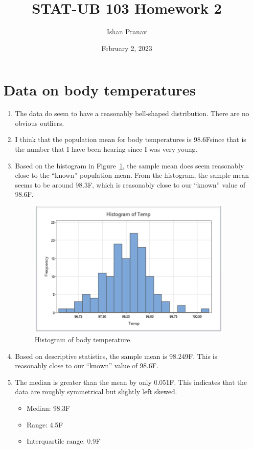 \documentclass[12pt]{article}
\title{STAT-UB 103 Homework 2}
\author{Ishan Pranav}
\date{February 2, 2023}
\newcommand{\degreef}{\degree F}
\begin{document}
\maketitle
\section{Data on body temperatures}
\begin{enumerate}
\item The data do seem to have a reasonably bell-shaped distribution. There are no obvious outliers. 

\item I think that the population mean for body temperatures is 98.6\degreef since that is the number that I have been hearing since I was very young. 

\item
Based on the histogram in Figure~\ref{fig:temperaturehistogram}, the sample mean does seem reasonably close to the “known” population mean. From the histogram, the sample mean seems to be around 98.3\degreef, which is reasonably close to our “known” value of 98.6\degreef. 

\begin{figure}
\begin{center}
\includegraphics[width=4in]{images/temperature-histogram.png}
\end{center}
\caption{Histogram of body temperature.\label{fig:temperaturehistogram}}
\end{figure}

\item Based on descriptive statistics, the sample mean is 98.249\degreef. This is reasonably close to our “known” value of 98.6\degreef. 

\item
The median is greater than the mean by only 0.051\degreef. This indicates that the data are roughly symmetrical but slightly left skewed.

\begin{itemize}
    \item Median: 98.3\degreef
    \item Range: 4.5\degreef
    \item Interquartile range: 0.9\degreef
\end{itemize}
\end{enumerate}
\end{document}
